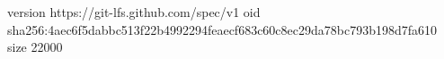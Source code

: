 version https://git-lfs.github.com/spec/v1
oid sha256:4aec6f5dabbc513f22b4992294feaecf683c60c8ec29da78bc793b198d7fa610
size 22000
